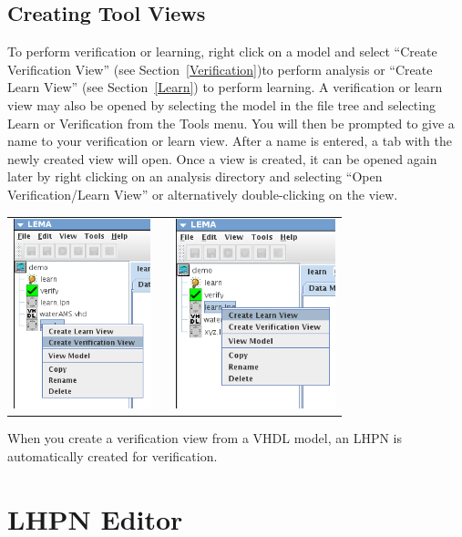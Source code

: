 \documentclass[titlepage,11pt]{article}
\begin{document}
\subsection{Creating Tool Views}

\noindent
To perform verification or learning, right click on a model and
select ``Create Verification View'' (see Section~\ref{Verification})to perform
analysis or ``Create Learn View'' (see Section~\ref{Learn})
to perform learning. A verification or learn view may also be opened by
selecting the model in the file tree and selecting Learn or Verification from
the Tools menu.  You will then be prompted to give a name to
your verification or learn view. After a name is entered, a tab with
the newly created view will open. Once a view is created, it can
be opened again later by right clicking on an analysis directory
and selecting ``Open Verification/Learn View'' or alternatively
double-clicking on the view.
\begin{center}
\begin{tabular}{ccc}
\includegraphics[height=55mm]{screenshots/createVerification} & & 
\includegraphics[height=55mm]{screenshots/createLearnLema}
\end{tabular}
\end{center}

When you create a verification view from a VHDL model, an LHPN is
automatically created for verification.

\section{\label{LHPNEdit}LHPN Editor}
\end{document}
